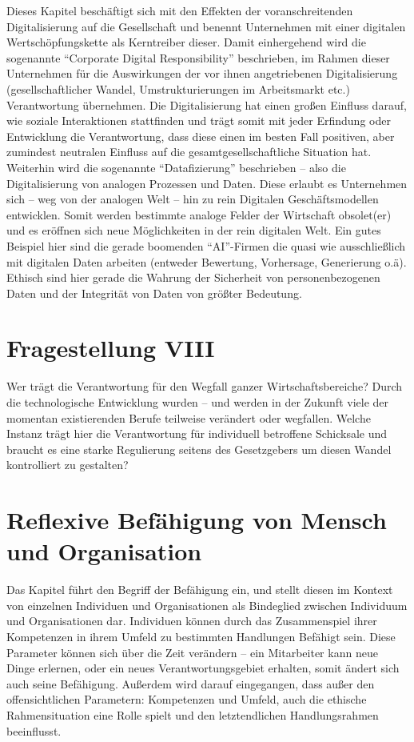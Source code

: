 \documentclass[journal]{IEEEtran}
\begin{document}
\begin{onecolumn}
Dieses Kapitel beschäftigt sich mit den Effekten der voranschreitenden Digitalisierung auf die Gesellschaft und
benennt Unternehmen mit einer digitalen Wertschöpfungskette als Kerntreiber dieser. Damit einhergehend wird
die sogenannte ``Corporate Digital Responsibility'' beschrieben, im Rahmen dieser Unternehmen für die Auswirkungen
der vor ihnen angetriebenen Digitalisierung (gesellschaftlicher Wandel, Umstrukturierungen im Arbeitsmarkt etc.)
Verantwortung übernehmen. Die Digitalisierung hat einen großen Einfluss darauf, wie soziale Interaktionen stattfinden
und trägt somit mit jeder Erfindung oder Entwicklung die Verantwortung, dass diese einen im besten Fall
positiven, aber zumindest neutralen Einfluss auf die gesamtgesellschaftliche Situation hat. Weiterhin wird die
sogenannte ``Datafizierung'' beschrieben – also die Digitalisierung von analogen Prozessen und Daten. Diese
erlaubt es Unternehmen sich – weg von der analogen Welt – hin zu rein Digitalen Geschäftsmodellen entwicklen.
Somit werden bestimmte analoge Felder der Wirtschaft obsolet(er) und es eröffnen sich neue Möglichkeiten in der
rein digitalen Welt. Ein gutes Beispiel hier sind die gerade boomenden ``AI''-Firmen die quasi wie ausschließlich
mit digitalen Daten arbeiten (entweder Bewertung, Vorhersage, Generierung o.ä). Ethisch sind hier gerade die Wahrung
der Sicherheit von personenbezogenen Daten und der Integrität von Daten von größter Bedeutung. 

\section*{Fragestellung VIII}

Wer trägt die Verantwortung für den Wegfall ganzer Wirtschaftsbereiche? Durch die technologische Entwicklung wurden
– und werden in der Zukunft viele der momentan existierenden Berufe teilweise verändert oder wegfallen. Welche Instanz
trägt hier die Verantwortung für individuell betroffene Schicksale und braucht es eine starke Regulierung seitens des
Gesetzgebers um diesen Wandel kontrolliert zu gestalten? 

\newpage

\section{Reflexive Befähigung von Mensch und Organisation}

Das Kapitel führt den Begriff der Befähigung ein, und stellt diesen im Kontext von einzelnen Individuen und 
Organisationen als Bindeglied zwischen Individuum und Organisationen dar. Individuen können durch das Zusammenspiel
ihrer Kompetenzen in ihrem Umfeld zu bestimmten Handlungen Befähigt sein. Diese Parameter können sich über die Zeit
verändern – ein Mitarbeiter kann neue Dinge erlernen, oder ein neues Verantwortungsgebiet erhalten, somit ändert
sich auch seine Befähigung. Außerdem wird darauf eingegangen, dass außer den offensichtlichen Parametern: Kompetenzen 
und Umfeld, auch die ethische Rahmensituation eine Rolle spielt und den letztendlichen Handlungsrahmen beeinflusst.


\end{onecolumn}
\end{document}
